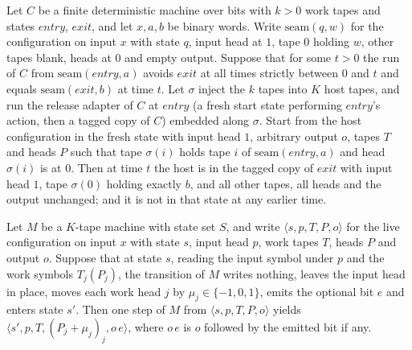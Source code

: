 \begin{theorem}
\label{Turing.NTimeDiag.qy_callHost}
\leanok
{}
Let $C$ be a finite deterministic machine over bits with $k > 0$ work tapes and states
$\mathit{entry}$, $\mathit{exit}$, and let $x, a, b$ be binary words. Write
$\mathrm{seam}(q, w)$ for the configuration on input $x$ with state $q$, input head at $1$, tape
$0$ holding $w$, other tapes blank, heads at $0$ and empty output. Suppose that for some $t > 0$
the run of $C$ from $\mathrm{seam}(\mathit{entry}, a)$ avoids $\mathit{exit}$ at all times
strictly between $0$ and $t$ and equals $\mathrm{seam}(\mathit{exit}, b)$ at time $t$. Let
$\sigma$ inject the $k$ tapes into $K$ host tapes, and run the release adapter of $C$ at
$\mathit{entry}$ (a fresh start state performing $\mathit{entry}$'s action, then a tagged copy of
$C$) embedded along $\sigma$. Start from the host configuration in the fresh state with input
head $1$, arbitrary output $o$, tapes $T$ and heads $P$ such that tape $\sigma(i)$ holds tape $i$
of $\mathrm{seam}(\mathit{entry}, a)$ and head $\sigma(i)$ is at $0$. Then at time $t$ the host is
in the tagged copy of $\mathit{exit}$ with input head $1$, tape $\sigma(0)$ holding exactly $b$,
and all other tapes, all heads and the output unchanged; and it is not in that state at any
earlier time.
\end{theorem}

\begin{theorem}
\label{Turing.NTimeDiag.qy_step}
\leanok
{}
Let $M$ be a $K$-tape machine with state set $S$, and write $\langle s, p, T, P, o\rangle$ for the
live configuration on input $x$ with state $s$, input head $p$, work tapes $T$, heads $P$ and
output $o$. Suppose that at state $s$, reading the input symbol under $p$ and the work symbols
$T_j(P_j)$, the transition of $M$ writes nothing, leaves the input head in place, moves each work
head $j$ by $\mu_j \in \{-1, 0, 1\}$, emits the optional bit $e$ and enters state $s'$. Then one
step of $M$ from $\langle s, p, T, P, o\rangle$ yields
$\langle s', p, T, (P_j + \mu_j)_j, o\,e\rangle$, where $o\,e$ is $o$ followed by the emitted bit
if any.
\end{theorem}

